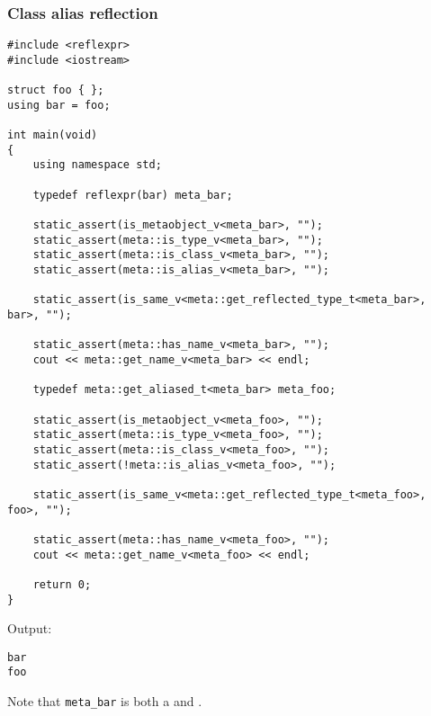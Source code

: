 \subsubsection{Class alias reflection}

\begin{verbatim}
#include <reflexpr>
#include <iostream>

struct foo { };
using bar = foo;

int main(void)
{
	using namespace std;

	typedef reflexpr(bar) meta_bar;

	static_assert(is_metaobject_v<meta_bar>, "");
	static_assert(meta::is_type_v<meta_bar>, "");
	static_assert(meta::is_class_v<meta_bar>, "");
	static_assert(meta::is_alias_v<meta_bar>, "");

	static_assert(is_same_v<meta::get_reflected_type_t<meta_bar>, bar>, "");

	static_assert(meta::has_name_v<meta_bar>, "");
	cout << meta::get_name_v<meta_bar> << endl;

	typedef meta::get_aliased_t<meta_bar> meta_foo;

	static_assert(is_metaobject_v<meta_foo>, "");
	static_assert(meta::is_type_v<meta_foo>, "");
	static_assert(meta::is_class_v<meta_foo>, "");
	static_assert(!meta::is_alias_v<meta_foo>, "");

	static_assert(is_same_v<meta::get_reflected_type_t<meta_foo>, foo>, "");

	static_assert(meta::has_name_v<meta_foo>, "");
	cout << meta::get_name_v<meta_foo> << endl;

	return 0;
}
\end{verbatim}

Output:

\begin{verbatim}
bar
foo
\end{verbatim}

Note that \texttt{meta\_bar} is both a  and .

